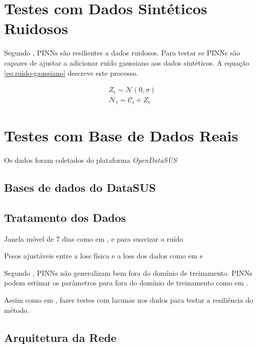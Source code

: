 \section{Testes com Dados Sintéticos Ruidosos}

Segundo \cite{raissi-etal:19}, PINNs são resilientes a dados ruidosos. Para
testar se PINNs são capazes de ajustar a 
adicionar ruído gaussiano aos dados sintéticos. A equação \ref{eq:ruido-gaussiano}
descreve este processo.

\begin{eqnarray}\label{eq:ruido-gaussiano}
    Z_t \sim \mathcal{N}(0, \sigma) \\
    \mathcal{N}_t = \mathcal{C}_t + Z_t  
\end{eqnarray}

\section{Testes com Base de Dados Reais}

Os dados foram coletados do plataforma \textit{OpenDataSUS} \cite{opendatasus}


\subsection{Bases de dados do DataSUS}

\subsection{Tratamento dos Dados}
Janela móvel de 7 dias como em \cite{han-etal:24-prim-artigo-alemanha},
\cite{long-etal:21-L2} e \cite{shamsara-etal:25-omicron} para suavizar o ruído

Pesos ajustáveis entre a loss física e a loss dos dados como em 
\cite{long-etal:21-L2} e 
\cite{shamsara-etal:25-omicron}

Segundo \cite{bonfanti-etal:24-generalizacao-pinns}, PINNs não generalizam bem
fora do domínio de treinamento. PINNs podem estimar os parâmetros para fora
do domínio de treinamento como em \cite{millevoi-etal:24-split-join-pinns}.

Assim como em \cite{ghosh-etal:23-subnotificacao}, fazer testes com lacunas
nos dados para testar a resiliência do método.

\subsection{Arquitetura da Rede}

